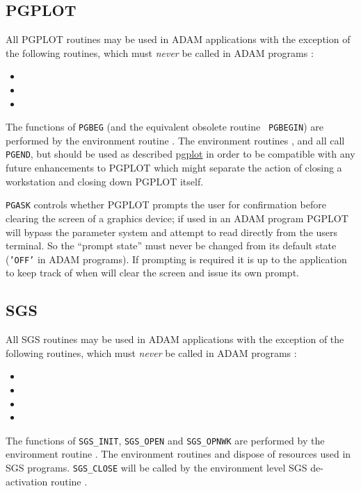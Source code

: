 \subsection{PGPLOT}

All PGPLOT routines may be used in ADAM applications with the exception of the
following routines, which must {\em never} be called in ADAM programs :
\begin{itemize}
\item {}
\item {}
\item {}
\end{itemize}
The functions of {\tt PGBEG} (and the equivalent obsolete routine {\tt 
PGBEGIN}) are performed by the environment routine 
. The 
environment routines , 
 and 
 all call {\tt PGEND}, 
but should be used as
described \hyperref{here}{in section~}{}{pgplot} in order to be compatible 
with any future
enhancements to PGPLOT which might separate the action of closing a
workstation and closing down PGPLOT itself.

{\tt PGASK} controls whether PGPLOT prompts the user for confirmation before 
clearing
the screen of a graphics device; if used in an ADAM program PGPLOT will bypass
the parameter system and attempt to read directly from the users terminal. So
the ``prompt state'' must never be changed from its 
default state ({\tt{'OFF'}} in
ADAM programs). If prompting is required it is up to the application to keep
track of when 
will clear the screen and issue its own prompt.

\subsection{SGS}

All SGS routines may be used in ADAM applications with the exception of the
following routines, which must {\em never} be called in ADAM programs :
\begin{itemize}
\item {}
\item {}
\item {}
\item {}
\end{itemize}
The functions of {\tt SGS\_INIT}, {\tt SGS\_OPEN} and {\tt SGS\_OPNWK} are 
performed by the environment routine .
The environment routines 
and  dispose of 
resources used in SGS programs.  {\tt SGS\_CLOSE} will be called by the 
environment level SGS de-activation routine 
.


